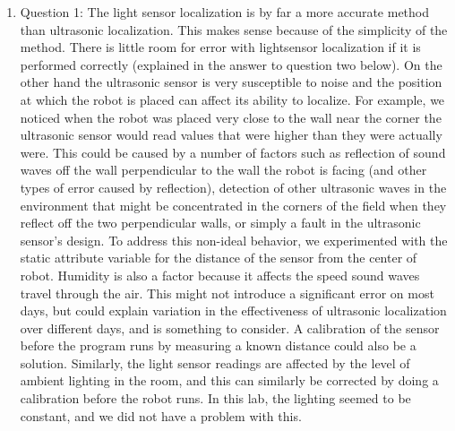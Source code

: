 \documentclass[twocolumn]{article}
\begin{document}
\begin{enumerate}

\item
Question 1:
The light sensor localization is by far a more accurate method than ultrasonic localization. This makes sense because of the simplicity of the method. There is little room for error with lightsensor localization if it is performed correctly (explained in the answer to question two below). On the other hand the ultrasonic sensor is very susceptible to noise and the position at which the robot is placed can affect its ability to localize. For example, we noticed when the robot was placed very close to the wall near the corner the ultrasonic sensor would read values that were higher than they were actually were. This could be caused by a number of factors such as reflection of sound waves off the wall perpendicular to the wall the robot is facing (and other types of error caused by reflection), detection of other ultrasonic waves in the environment that might be concentrated in the corners of the field when they reflect off the two perpendicular walls, or simply a fault in the ultrasonic sensor’s design. To address this non-ideal behavior, we experimented with the static attribute variable for the distance of the sensor from the center of robot. Humidity is also a factor because it affects the speed sound waves travel through the air. This might not introduce a significant error on most days, but could explain variation in the effectiveness of ultrasonic localization over different days, and is something to consider. A calibration of the sensor before the program runs by measuring a known distance could also be a solution. Similarly, the light sensor readings are affected by the level of ambient lighting in the room, and this can similarly be corrected by doing a calibration before the robot runs. In this lab, the lighting seemed to be constant, and we did not have a problem with this.


\end{enumerate}
\end{document}
